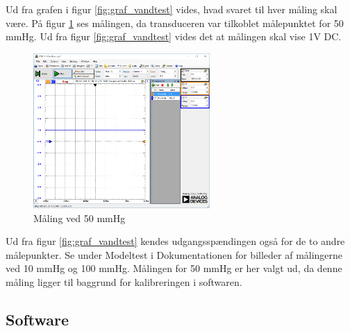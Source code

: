 Ud fra grafen i figur \ref{fig:graf_vandtest} vides, hvad svaret til hver måling skal være. På figur \ref{fig:vandtest_måling50} ses målingen, da transduceren var tilkoblet målepunktet for 50 mmHg. Ud fra figur \ref{fig:graf_vandtest} vides det at målingen skal vise 1V DC.  
\begin{figure}[H]
	\centering	\includegraphics[width=0.6\textwidth]{Figurer/50mmhg}
	\caption{Måling ved 50 mmHg}
	\label{fig:vandtest_måling50}
\end{figure}
Ud fra figur \ref{fig:graf_vandtest} kendes udgangsspændingen også for de to andre målepunkter. Se under Modeltest i Dokumentationen for billeder af målingerne ved 10 mmHg og 100 mmHg. Målingen for 50 mmHg er her valgt ud, da denne måling ligger til baggrund for kalibreringen i softwaren. 
\subsection{Software}

